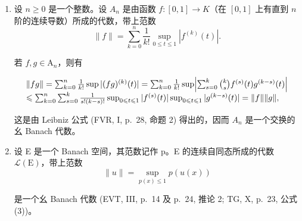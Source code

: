 \begin{enumerate}
若 X 是紧的，则有 \(\mathcal{C}_{b}(\mathrm{X};\mathrm{K}) = \mathcal{H}(\mathrm{X};\mathrm{K}) = \mathcal{C}(\mathrm{X};\mathrm{K})\)，即 X 上取值于 K 的连续函数所成的赋范幺代数 \(\mathcal{C}(\mathrm{X};\mathrm{K})\)。这时，元素 \(f \in \mathcal{C}(\mathrm{X};\mathrm{K})\) 可逆必须且只需 f 不取值 0，且 f 的谱等于 f 的值集 \(f(\mathrm{X})\)。

此后假定 X 不是紧的。于是代数 \(\mathcal{C}_{0}(X;K)\) 不是幺的；由它添加单位元而得到的代数与子代数 \(K \cdot 1 \oplus \mathcal{C}_{0}(X;K)\)（\(\mathcal{C}(X;K)\) 的由在无穷远处有极限的函数所成的子代数）视为同一。这个子代数的一个元素可逆必须且只需它不为零且它在无穷远处的极限非零。由此得出，对每个 \(f \in \mathcal{C}_{0}(X;K)\)，f 的谱等于 \(f(X) \cup \{0\}\)。

\(f \in \mathcal{K}(\mathrm{X};\mathrm{K})\) 的谱等于 \(f(\mathrm{X})\)（事实上，若 \(\mathrm{X}\) 不是紧的，则 0 属于 \(f(\mathrm{X})\)）。

\item
  设 \(n \geqslant 0\) 是一个整数。设 \(A_{n}\) 是由函数 \(f: [0,1] \to K\)（在 \([0,1]\) 上有直到 \(n\) 阶的连续导数）所成的代数，带上范数
\[
\| f \| = \sum_ {k = 0} ^ {n} \frac {1}{k !} \sup _ {0 \leqslant t \leqslant 1} | f ^ {(k)} (t) |.
\]

若 \(f,g\in \mathrm{A}_n\)，则有

\[
\begin{array}{l} \| f g \| = \sum_ {k = 0} ^ {n} \frac {1}{k !} \sup | (f g) ^ {(k)} (t) | = \sum_ {k = 0} ^ {n} \frac {1}{k !} \sup \Bigl | \sum_ {s = 0} ^ {k} \binom {k} {s} f ^ {(s)} (t) g ^ {(k - s)} (t) \Bigr | \\ \leqslant \sum_ {k = 0} ^ {n} \sum_ {s = 0} ^ {k} \frac {1}{s ! (k - s) !} \sup _ {0 \leqslant t \leqslant 1} | f ^ {(s)} (t) | \sup _ {0 \leqslant t \leqslant 1} | g ^ {(k - s)} (t) | = \| f \|   \| g \|, \end{array}
\]

这是由 Leibniz 公式 (FVR, I, p.~28, 命题 2) 得出的，因而 \(A_{n}\) 是一个交换的幺 Banach 代数。

\item
  设 E 是一个 Banach 空间，其范数记作 p。E 的连续自同态所成的代数 \(\mathcal{L}(\mathrm{E})\)，带上范数
\[
\| u \| = \sup _ {p (x) \leqslant 1} p (u (x))
\]

是一个幺 Banach 代数 (EVT, III, p.~14 及 p.~24, 推论 2; TG, X, p.~23, 公式 (3))。


\end{enumerate}
